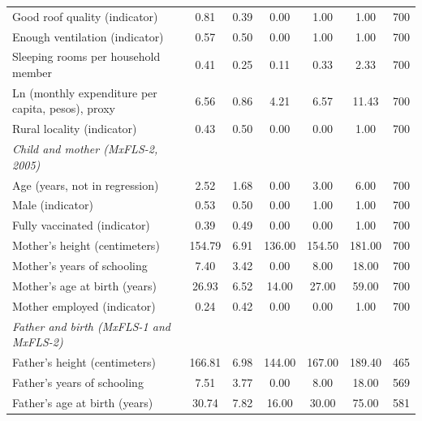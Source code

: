 \documentclass[12pt]{article}
\begin{document}
\begin{longtable}{l*{6}{c}}
Good roof quality (indicator)&        0.81&        0.39&        0.00&        1.00&        1.00&         700\\
Enough ventilation (indicator)&        0.57&        0.50&        0.00&        1.00&        1.00&         700\\
Sleeping rooms per household member&        0.41&        0.25&        0.11&        0.33&        2.33&         700\\
Ln (monthly expenditure per capita, pesos), proxy&        6.56&        0.86&        4.21&        6.57&       11.43&         700\\
Rural locality (indicator)&        0.43&        0.50&        0.00&        0.00&        1.00&         700\\
\addlinespace[6pt]\textit{Child and mother (MxFLS-2, 2005)}&            &            &            &            &            &            \\
Age (years, not in regression)&        2.52&        1.68&        0.00&        3.00&        6.00&         700\\
Male (indicator)    &        0.53&        0.50&        0.00&        1.00&        1.00&         700\\
Fully vaccinated (indicator)&        0.39&        0.49&        0.00&        0.00&        1.00&         700\\
Mother's height (centimeters)&      154.79&        6.91&      136.00&      154.50&      181.00&         700\\
Mother's years of schooling&        7.40&        3.42&        0.00&        8.00&       18.00&         700\\
Mother's age at birth (years)&       26.93&        6.52&       14.00&       27.00&       59.00&         700\\
Mother employed (indicator)&        0.24&        0.42&        0.00&        0.00&        1.00&         700\\
\addlinespace[6pt]\textit{Father and birth (MxFLS-1 and MxFLS-2)}&            &            &            &            &            &            \\
Father's height (centimeters)&      166.81&        6.98&      144.00&      167.00&      189.40&         465\\
Father's years of schooling&        7.51&        3.77&        0.00&        8.00&       18.00&         569\\
Father's age at birth (years)&       30.74&        7.82&       16.00&       30.00&       75.00&         581\\

\end{longtable}
\end{document}
